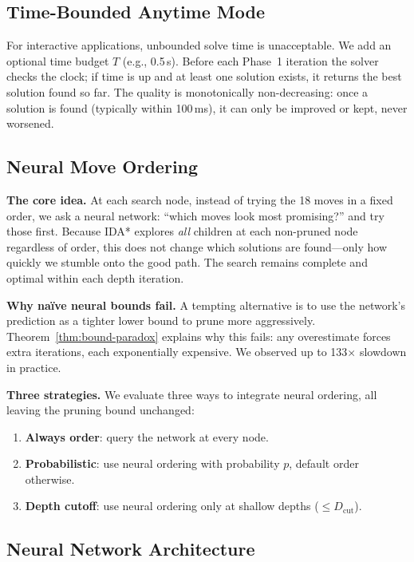 \documentclass[graybox]{svmult}
\begin{document}
\subsection{Time-Bounded Anytime Mode}
\label{sec:anytime}

For interactive applications, unbounded solve time is unacceptable. We add an optional time budget $T$ (e.g., 0.5\,s). Before each Phase~1 iteration the solver checks the clock; if time is up and at least one solution exists, it returns the best solution found so far. The quality is monotonically non-decreasing: once a solution is found (typically within 100\,ms), it can only be improved or kept, never worsened.

\subsection{Neural Move Ordering}
\label{sec:neural-strategies}

\textbf{The core idea.} At each search node, instead of trying the 18 moves in a fixed order, we ask a neural network: ``which moves look most promising?'' and try those first. Because IDA* explores \emph{all} children at each non-pruned node regardless of order, this does not change which solutions are found---only how quickly we stumble onto the good path. The search remains complete and optimal within each depth iteration.

\textbf{Why na\"ive neural bounds fail.} A tempting alternative is to use the network's prediction as a tighter lower bound to prune more aggressively. Theorem~\ref{thm:bound-paradox} explains why this fails: any overestimate forces extra iterations, each exponentially expensive. We observed up to 133$\times$ slowdown in practice.

\textbf{Three strategies.} We evaluate three ways to integrate neural ordering, all leaving the pruning bound unchanged:
\begin{enumerate}[leftmargin=*]
  \item[\textbf{A.}] \textbf{Always order}: query the network at every node.
  \item[\textbf{B.}] \textbf{Probabilistic}: use neural ordering with probability $p$, default order otherwise.
  \item[\textbf{C.}] \textbf{Depth cutoff}: use neural ordering only at shallow depths ($\leq D_{\mathrm{cut}}$).
\end{enumerate}

\subsection{Neural Network Architecture}
\label{sec:neural-arch}
\end{document}
